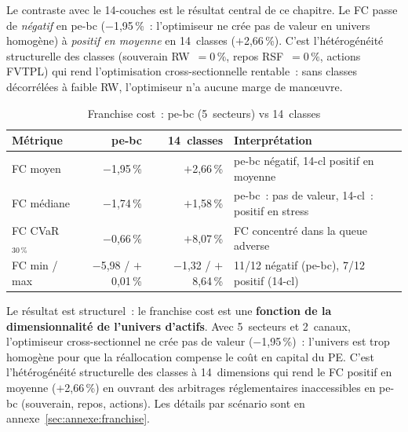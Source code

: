 \documentclass[10pt, a4paper, oneside]{report}
\theoremstyle{definition}
\begin{document}
Le contraste avec le 14-couches est le résultat central de ce chapitre. Le FC passe de \emph{négatif} en pe-bc ($-$1{,}95\,\%~: l'optimiseur ne crée pas de valeur en univers homogène) à \emph{positif en moyenne} en 14~classes ($+$2{,}66\,\%). C'est l'hétérogénéité structurelle des classes (souverain RW~$= 0\,\%$, repos RSF~$= 0\,\%$, actions FVTPL) qui rend l'optimisation cross-sectionnelle rentable~: sans classes décorrélées à faible RW, l'optimiseur n'a aucune marge de manœuvre.

\begin{table}[htbp]
\centering
\caption{Franchise cost~: pe-bc (5~secteurs) vs 14~classes}
\label{tab:fc-comparatif}
\small
\begin{tabular}{lrrl}
\toprule
Métrique & pe-bc & 14~classes & Interprétation \\
\midrule
FC moyen & $-$1{,}95\,\% & $+$2{,}66\,\% & pe-bc négatif, 14-cl positif en moyenne \\
FC médiane & $-$1{,}74\,\% & $+$1{,}58\,\% & pe-bc~: pas de valeur, 14-cl~: positif en stress \\
FC CVaR$_{30\,\%}$ & $-$0{,}66\,\% & $+$8{,}07\,\% & FC concentré dans la queue adverse \\
FC min / max & $-$5{,}98 / $+$0{,}01\,\% & $-$1{,}32 / $+$8{,}64\,\% & 11/12 négatif (pe-bc), 7/12 positif (14-cl) \\
\bottomrule
\end{tabular}
\end{table}

Le résultat est structurel~: le franchise cost est une \textbf{fonction de la dimensionnalité de l'univers d'actifs}. Avec 5~secteurs et 2~canaux, l'optimiseur cross-sectionnel ne crée pas de valeur ($-$1{,}95\,\%)~: l'univers est trop homogène pour que la réallocation compense le coût en capital du PE. C'est l'hétérogénéité structurelle des classes à 14~dimensions qui rend le FC positif en moyenne ($+$2{,}66\,\%) en ouvrant des arbitrages réglementaires inaccessibles en pe-bc (souverain, repos, actions). Les détails par scénario sont en annexe~\ref{sec:annexe:franchise}.
\end{document}
